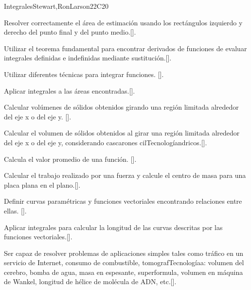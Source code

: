 \begin{syllabus}
\begin{unit}{Integrales}{}{Stewart,RonLarson}{22}{C20}
\begin{topics}
   \end{topics}

   \begin{learningoutcomes}
      \item Resolver correctamente el área de estimación usando los rectángulos izquierdo y derecho del punto final y del punto medio.[\Assessment].
      \item Utilizar el teorema fundamental para encontrar derivados de funciones de evaluar integrales definidas e indefinidas mediante sustitución.[\Assessment].
      \item Utilizar diferentes técnicas para integrar funciones. [\Assessment].
      \item Aplicar integrales a las áreas encontradas.[\Assessment].
      \item Calcular volúmenes de sólidos obtenidos girando una región limitada alrededor del eje x o del eje y. [\Assessment].
      \item Calcular el volumen de sólidos obtenidos al girar una región limitada alrededor del eje x o del eje y, considerando cascarones cilTecnologíandricos.[\Assessment].
      \item Calcula el valor promedio de una función. [\Assessment].
      \item Calcular el trabajo realizado por una fuerza y calcule el centro de masa para una placa plana en el plano.[\Assessment].
      \item Definir curvas paramétricas y funciones vectoriales encontrando relaciones entre ellas. [\Assessment].
      \item Aplicar integrales para calcular la longitud de las curvas descritas por las funciones vectoriales.[\Assessment].
      \item Ser capaz de resolver problemas de aplicaciones simples tales como tráfico en un servicio de Internet, consumo de combustible, tomografTecnologíaa: volumen del cerebro, bomba de agua, masa en espesante, superformula, volumen en máquina de Wankel, longitud de hélice de molécula de ADN, etc.[\Assessment].
    \end{learningoutcomes}
\end{unit}

\begin{coursebibliography}
\end{coursebibliography}

\end{syllabus}
